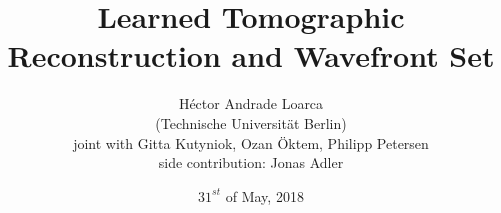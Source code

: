 \title[AFG Oberseminar]{Learned Tomographic Reconstruction and Wavefront Set}
\author[H\'ector Andrade Loarca]{H\'ector Andrade Loarca\\ \scriptsize{(Technische Universit\"at Berlin)} \\
				\scriptsize{joint with Gitta Kutyniok, Ozan \"Oktem, Philipp Petersen}\\
				\scriptsize{side contribution: Jonas Adler}}
\date[31.05.2018]{$31^{st}$ of May, 2018}


\newcommand{\mylogo}{\texttt{[image: ./Images/AFG.pdf]}}

\begin{frame}[plain]
	\titlepage
\end{frame}

